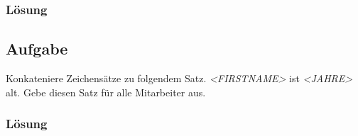 \subsubsection*{Lösung}
\label{sec:uebung_03.aufgabe_12.loesung}

\subsection{Aufgabe}
\label{sec:uebung_03.aufgabe_13}
Konkateniere Zeichensätze zu folgendem Satz. \textit{<FIRSTNAME>} ist \textit{<JAHRE>} alt. Gebe diesen Satz für alle Mitarbeiter aus.

\subsubsection*{Lösung}
\label{sec:uebung_03.aufgabe_13.loesung}
